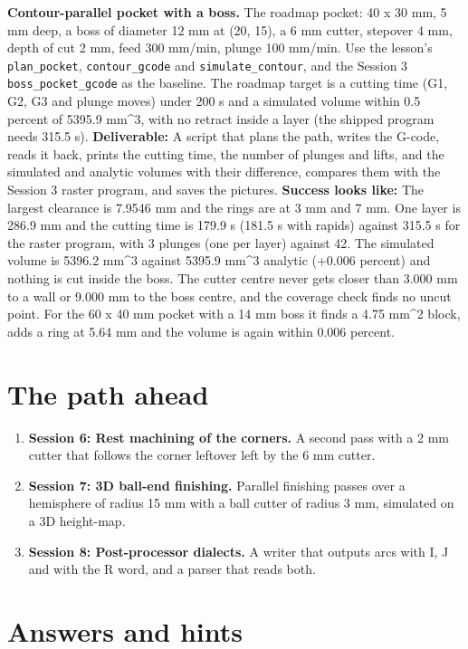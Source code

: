 \documentclass[11pt,a4paper]{article}
\begin{document}
\textbf{Contour-parallel pocket with a boss.} The roadmap pocket: 40 x 30 mm, 5 mm deep, a boss of diameter 12 mm at (20, 15), a 6 mm cutter, stepover 4 mm, depth of cut 2 mm, feed 300 mm/min, plunge 100 mm/min. Use the lesson's \texttt{plan\_pocket}, \texttt{contour\_gcode} and \texttt{simulate\_contour}, and the Session 3 \texttt{boss\_pocket\_gcode} as the baseline. The roadmap target is a cutting time (G1, G2, G3 and plunge moves) under 200 s and a simulated volume within 0.5 percent of 5395.9 mm\textasciicircum{}3, with no retract inside a layer (the shipped program needs 315.5 s). \textbf{Deliverable:} A script that plans the path, writes the G-code, reads it back, prints the cutting time, the number of plunges and lifts, and the simulated and analytic volumes with their difference, compares them with the Session 3 raster program, and saves the pictures. \textbf{Success looks like:} The largest clearance is 7.9546 mm and the rings are at 3 mm and 7 mm. One layer is 286.9 mm and the cutting time is 179.9 s (181.5 s with rapids) against 315.5 s for the raster program, with 3 plunges (one per layer) against 42. The simulated volume is 5396.2 mm\textasciicircum{}3 against 5395.9 mm\textasciicircum{}3 analytic (+0.006 percent) and nothing is cut inside the boss. The cutter centre never gets closer than 3.000 mm to a wall or 9.000 mm to the boss centre, and the coverage check finds no uncut point. For the 60 x 40 mm pocket with a 14 mm boss it finds a 4.75 mm\textasciicircum{}2 block, adds a ring at 5.64 mm and the volume is again within 0.006 percent.

\section{The path ahead}
\begin{enumerate}[nosep]
\item \textbf{Session 6: Rest machining of the corners.} A second pass with a 2 mm cutter that follows the corner leftover left by the 6 mm cutter.
\item \textbf{Session 7: 3D ball-end finishing.} Parallel finishing passes over a hemisphere of radius 15 mm with a ball cutter of radius 3 mm, simulated on a 3D height-map.
\item \textbf{Session 8: Post-processor dialects.} A writer that outputs arcs with I, J and with the R word, and a parser that reads both.
\end{enumerate}

\section{Answers and hints}
\end{document}
